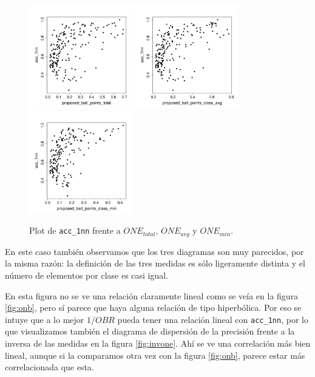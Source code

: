 \documentclass[a4paper,12pt]{report}
\theoremstyle{definition}
\begin{document}
\begin{figure}[H]
  \centering
  \includegraphics[width=0.4\textwidth]{plots/proposed/1nn_vs_proposed_ball_points_total}
  \includegraphics[width=0.4\textwidth]{plots/proposed/1nn_vs_proposed_ball_points_class_avg}
  \includegraphics[width=0.4\textwidth]{plots/proposed/1nn_vs_proposed_ball_points_class_min}
  \caption{Plot de \texttt{acc\_1nn} frente a $ONE_{total}$, $ONE_{avg}$ y $ONE_{min}$.}
  \label{fig:one}
\end{figure}

En este caso también observamos que los tres diagramas son muy parecidos, por la misma razón: la definición de las tres medidas es sólo ligeramente distinta y el número de elementos por clase es casi igual.

En esta figura no se ve una relación claramente lineal como se veía en la figura \ref{fig:onb}, pero sí parece que haya alguna relación de tipo hiperbólica. Por eso se intuye que a lo mejor $1/OBR$ pueda tener una relación lineal con \texttt{acc\_1nn}, por lo que visualizamos también el diagrama de dispersión de la precisión frente a la inversa de las medidas en la figura \ref{fig:invone}. Ahí se ve una correlación más bien lineal, aunque si la comparamos otra vez con la figura \ref{fig:onb}, parece estar más correlacionada que esta.
\end{document}
